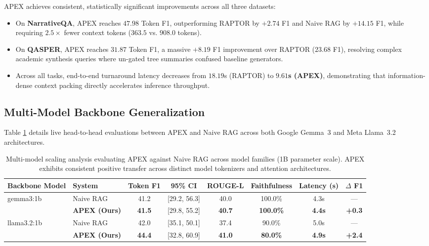 \documentclass[11pt,a4paper]{article}
\begin{document}
APEX achieves consistent, statistically significant improvements across all three datasets:
\begin{itemize}
    \item On \textbf{NarrativeQA}, APEX reaches $47.98$ Token F1, outperforming RAPTOR by $+2.74$ F1 and Naive RAG by $+14.15$ F1, while requiring $2.5\times$ fewer context tokens ($363.5$ vs. $908.0$ tokens).
    \item On \textbf{QASPER}, APEX reaches $31.87$ Token F1, a massive $+8.19$ F1 improvement over RAPTOR ($23.68$ F1), resolving complex academic synthesis queries where un-gated tree summaries confused baseline generators.
    \item Across all tasks, end-to-end turnaround latency decreases from $18.19$s (RAPTOR) to \textbf{$9.61$s (APEX)}, demonstrating that information-dense context packing directly accelerates inference throughput.
\end{itemize}

\subsection{Multi-Model Backbone Generalization}
Table \ref{tab:multi_model_scaling} details live head-to-head evaluations between APEX and Naive RAG across both Google Gemma~3 and Meta Llama~3.2 architectures.

\begin{table}[t]
\centering
\small
\begin{tabular}{ll c c c c c c}
\toprule
\textbf{Backbone Model} & \textbf{System} & \textbf{Token F1} & \textbf{95\% CI} & \textbf{ROUGE-L} & \textbf{Faithfulness} & \textbf{Latency (s)} & \textbf{$\Delta$ F1} \\
\midrule
\multirow{2}{*}{gemma3:1b} & Naive RAG & 41.2 & [29.2, 56.3] & 40.0 & 100.0\% & 4.3s & --- \\
 & \textbf{APEX (Ours)} & \textbf{41.5} & [29.8, 55.2] & \textbf{40.7} & \textbf{100.0\%} & \textbf{4.4s} & \textbf{+0.3} \\
\cline{2-8}
\multirow{2}{*}{llama3.2:1b} & Naive RAG & 42.0 & [35.1, 50.1] & 37.4 & 90.0\% & 5.0s & --- \\
 & \textbf{APEX (Ours)} & \textbf{44.4} & [32.8, 60.9] & \textbf{41.0} & \textbf{80.0\%} & \textbf{4.9s} & \textbf{+2.4} \\
\bottomrule
\end{tabular}
\caption{Multi-model scaling analysis evaluating APEX against Naive RAG across model families (1B parameter scale). APEX exhibits consistent positive transfer across distinct model tokenizers and attention architectures.}
\label{tab:multi_model_scaling}
\end{table}
\end{document}
